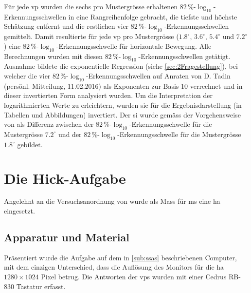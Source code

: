\documentclass[11pt, twoside, a4paper]{book}		%
\begin{document}
Für jede \gls{vp} wurden die sechs pro Mustergrösse erhaltenen $82\,\%$-$\log_{10}$-Er\-ken\-nungs\-schwel\-len in eine Rangreihenfolge gebracht, die tiefste und höchste Schätzung entfernt und die restlichen vier $82\,\%$-$\log_{10}$-Er\-ken\-nungs\-schwel\-len gemittelt. Damit resultierte für jede \gls{vp} pro Mustergrösse ($1.8^{\circ}$, $3.6^{\circ}$, $5.4^{\circ}$ und $7.2^{\circ}$) eine $82\,\%$-$\log_{10}$-Er\-ken\-nungs\-schwel\-le für horizontale Bewegung. 
Alle Berechnungen wurden mit diesen $82\,\%$-$\log_{10}$-Er\-ken\-nungs\-schwel\-len getätigt. 
Ausnahme bildete die exponentielle Regression (siehe \autoref{sec:2Fragestellung}), bei welcher die vier $82\,\%$-$\log_{10}$-Er\-ken\-nungs\-schwel\-len auf Anraten von D. Tadin (persönl. Mitteilung, 11.02.2016) als Exponenten zur Basis 10 verrechnet und in dieser invertierten Form analysiert wurden.
Um die Interpretation der logarithmierten Werte zu erleichtern, wurden sie für die Ergebnisdarstellung (in Tabellen und Abbildungen) invertiert.
Der \gls{si} wurde gemäss der Vorgehensweise von \citet{Melnick2013} als Differenz zwischen der $82\,\%$-$\log_{10}$-Er\-ken\-nungs\-schwel\-le für die Mustergrösse $7.2^{\circ}$ und der $82\,\%$-$\log_{10}$-Er\-ken\-nungs\-schwel\-le für die Mustergrösse $1.8^{\circ}$ gebildet. 


\section{Die Hick-Aufgabe \label{sec:Hick}}

Angelehnt an die Versuchsanordnung von \citet{Rammsayer2007} wurde als Mass für \gls{ms} eine \gls{ha} eingesetzt.

\subsection{Apparatur und Material \label{sub:}}
Präsentiert wurde die Aufgabe auf dem in \autoref{sub:ssas} beschriebenen Computer, mit dem einzigen Unterschied, dass die Auflösung des Monitors für die \gls{ha} $1280 \times 1024$ Pixel betrug. Die Antworten der \glspl{vp} wurden mit einer Cedrus RB-830 Tastatur erfasst. 
\end{document}
